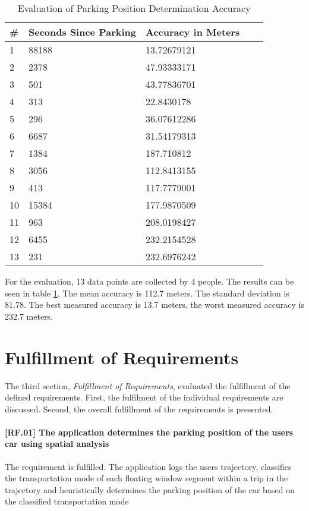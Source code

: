 \begin{table}[h!]
    \centering
    \begin{tabular}{|l|l|l|l|l|} \toprule
        \# & Seconds Since Parking & Accuracy in Meters \\ \midrule
        1 & 88188 & 13.72679121 \\ 
        2 & 2378 & 47.93333171 \\ 
        3 & 501 & 43.77836701 \\ 
        4 & 313 & 22.8430178 \\ 
        5 & 296 & 36.07612286 \\ 
        6 & 6687 & 31.54179313 \\ 
        7 & 1384 & 187.710812 \\ 
        8 & 3056 & 112.8413155 \\ 
        9 & 413 & 117.7779001 \\ 
        10 & 15384 & 177.9870509 \\ 
        11 & 963 & 208.0198427 \\ 
        12 & 6455 & 232.2154528 \\ 
        13 & 231 & 232.6976242 \\ \bottomrule 
    \end{tabular}
    \caption{Evaluation of Parking Position Determination Accuracy}
    \label{table:acc_eval}
\end{table}{}



For the evaluation, 13 data points are collected by 4 people. The results can be seen in table \ref{table:acc_eval}. The mean accuracy is 112.7 meters. The standard deviation is 81.78. The best measured accuracy is 13.7 meters, the worst measured accuracy is 232.7 meters.


\section{Fulfillment of Requirements}
The third section, \textit{Fulfillment of Requirements}, evaluated the fulfillment of the defined requirements. First, the fulfilment of the individual requirements are discussed. Second, the overall fulfillment of the requirements is presented. 

\paragraph{[RF.01] The application determines the parking position of the users car using spatial analysis}
The requirement is fulfilled. The application logs the users trajectory, classifies the transportation mode of each floating window segment within a trip in the trajectory and heuristically determines the parking position of the car based on the classified transportation mode

